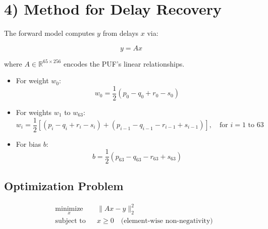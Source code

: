\documentclass[11pt]{article}
\begin{document}
\section*{4) Method for Delay Recovery}
The forward model computes \(y\) from delays \(x\) via:

\begin{equation*}
y = A x
\end{equation*}

where \(A \in \mathbb{R}^{65 \times 256}\) encodes the PUF's linear relationships. 

\begin{itemize}
    \item For weight \(w_0\):
    \[
    w_0 = \frac{1}{2}(p_0 - q_0 + r_0 - s_0)
    \]

    \item For weights \(w_1\) to \(w_{63}\):
    \[
    w_i = \frac{1}{2}\left[
    (p_i - q_i + r_i - s_i) + (p_{i-1} - q_{i-1} - r_{i-1} + s_{i-1})
    \right], \quad \text{for } i = 1 \text{ to } 63
    \]

    \item For bias \(b\):
    \[
    b = \frac{1}{2}(p_{63} - q_{63} - r_{63} + s_{63})
    \]
\end{itemize}

\subsection*{Optimization Problem}
\begin{equation*}
\begin{aligned}
& \underset{x}{\text{minimize}} & & \|A x - y\|_2^2 \\
& \text{subject to} & & x \geq 0 \quad \text{(element-wise non-negativity)}
\end{aligned}
\end{equation*}
\end{document}
